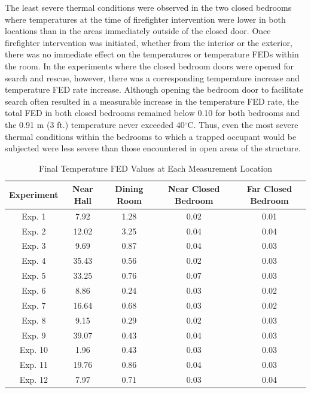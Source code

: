 \documentclass[12pt,oneside]{article}
\begin{document}
The least severe thermal conditions were observed in the  two closed bedrooms where temperatures at the time of firefighter intervention were lower in both locations than in the areas immediately outside of the closed door. Once firefighter intervention was initiated, whether from the interior or the exterior, there was no immediate effect on the temperatures or temperature FEDs within the room. In the experiments where the closed bedroom doors were opened for search and rescue, however, there was a corresponding temperature increase and temperature FED rate increase. Although opening the bedroom door to facilitate search often resulted in a measurable increase in the temperature FED rate, the total FED in both closed bedrooms remained below 0.10 for both bedrooms and the 0.91 m (3 ft.) temperature never exceeded 40$^{\circ}$C. Thus, even the most severe thermal conditions within the bedrooms to which a trapped occupant would be subjected were less severe than those encountered in open areas of the structure. 

\begin{table}[!ht]
    \centering
    \caption{Final Temperature FED Values at Each Measurement Location}
    \label{tab:temp_fed}
    \begin{tabular}{ccccc}
    \toprule[1.5pt]
	\textbf{Experiment}  &   \textbf{Near Hall}& \textbf{Dining Room}& \textbf{Near Closed Bedroom}& \textbf{Far Closed Bedroom} \\ 
	\midrule                                                                   
	Exp. 1 &7.92        & 1.28        		& 0.02     & 0.01        \\  
	Exp. 2 &12.02       & 3.25       		& 0.04     & 0.04        \\
	Exp. 3 & 9.69    	& 0.87        		& 0.04     & 0.03        \\               
	Exp. 4 & 35.43      & 0.56         		& 0.02     & 0.03        \\                
	Exp. 5 & 33.25      & 0.76          	& 0.07     & 0.03        \\                 
	Exp. 6 & 8.86       & 0.24         		& 0.03     & 0.02        \\                 
	Exp. 7 & 16.64      & 0.68         		& 0.03     & 0.02        \\                
	Exp. 8 & 9.15       & 0.29         		& 0.02     & 0.03        \\            
	Exp. 9 & 39.07      & 0.43          	& 0.04     & 0.03        \\              
	Exp. 10& 1.96       & 0.43          	& 0.03     & 0.03        \\         
	Exp. 11& 19.76      & 0.86           	& 0.04     & 0.03        \\             
	Exp. 12& 7.97       & 0.71          	& 0.03     & 0.04        \\           
	\bottomrule[1.25pt] 

    \end{tabular}
\end{table}                   
\end{document}
